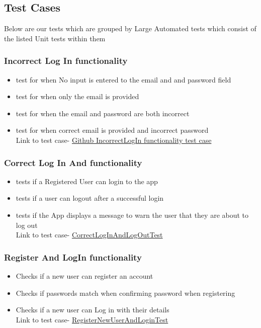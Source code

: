 \documentclass[english]{article}
\begin{document}
	\subsection {Test Cases}
	Below are our tests which are grouped by Large Automated tests which consist of the listed Unit tests within them
		\subsubsection{Incorrect Log In functionality}
		\begin{itemize} 
			\item test for when No input is entered to the email and and password field
			\item test for when only the email is provided 
			\item test for when the email and password  are both incorrect
			\item test for when correct email is provided and incorrect password\\


			Link to test case-
			\href{https://github.com/XoloKDandashe/Alpha-Tech/blob/master/Code/NFCBusinessCardLocal2/app/src/androidTest/java/com/example/www/nfcbusinesscardlocal/LoginCorrectDetails.java}{Github IncorrectLogIn functionality test case}

		\end{itemize}
		\subsubsection{Correct Log In And functionality}
		\begin{itemize} 
			\item tests if a Registered User can login to the app
			\item tests if a user can logout after a successful login
			\item tests if the App displays a message to warn the user that they are about to log out
			\\	Link to test case-
			\href{https://github.com/XoloKDandashe/Alpha-Tech/blob/master/Code/NFCBusinessCardLocal2/app/src/androidTest/java/com/example/www/nfcbusinesscardlocal/LoginLogoutTest.java}{CorrectLogInAndLogOutTest}
		\end{itemize}

		\subsubsection{Register And LogIn functionality}
		\begin{itemize} 
			\item Checks if a new user can register an account
			\item Checks if passwords match when confirming password when registering
			\item Checks if a new user can Log in with their details 
			\\	Link to test case-
	\href{https://github.com/XoloKDandashe/Alpha-Tech/blob/master/Code/NFCBusinessCardLocal2/app/src/androidTest/java/com/example/www/nfcbusinesscardlocal/RegisterNewUserAndLogInTest.java}{RegisterNewUserAndLoginTest}

			
		\end{itemize}
\end{document}
